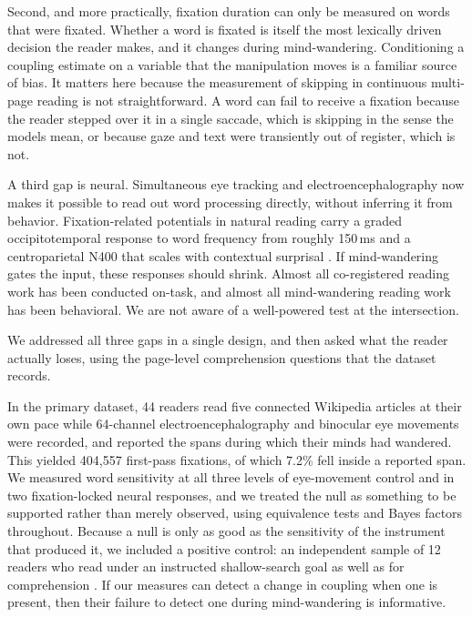\documentclass[11pt]{article}
\begin{document}
Second, and more practically, fixation duration can only be measured on words that were
fixated. Whether a word is fixated is itself the most lexically driven decision the reader
makes, and it changes during mind-wandering. Conditioning a coupling estimate on a variable
that the manipulation moves is a familiar source of bias. It matters here because the
measurement of skipping in continuous multi-page reading is not straightforward. A word can
fail to receive a fixation because the reader stepped over it in a single saccade, which is
skipping in the sense the models mean, or because gaze and text were transiently out of
register, which is not.

A third gap is neural. Simultaneous eye tracking and electroencephalography now makes it
possible to read out word processing directly, without inferring it from behavior. Fixation-related
potentials in natural reading carry a graded occipitotemporal response to word frequency
from roughly 150\,ms and a centroparietal N400 that scales with contextual surprisal
\citep{dimigen2011,kutas2011,frank2015}. If mind-wandering gates the input, these responses
should shrink. Almost all co-registered reading work has been conducted on-task, and almost
all mind-wandering reading work has been behavioral. We are not aware of a well-powered test
at the intersection.

We addressed all three gaps in a single design, and then asked what the reader actually loses,
using the page-level comprehension questions that the dataset records.

In the primary dataset, 44 readers read five
connected Wikipedia articles at their own pace while 64-channel electroencephalography and
binocular eye movements were recorded, and reported the spans during which their minds had
wandered. This yielded 404{,}557 first-pass fixations, of which 7.2\% fell inside a reported
span. We measured word sensitivity at all three levels of eye-movement control and in two
fixation-locked neural responses, and we treated the null as something to be supported rather
than merely observed, using equivalence tests and Bayes factors throughout. Because a null is
only as good as the sensitivity of the instrument that produced it, we included a positive
control: an independent sample of 12 readers who read under an instructed shallow-search goal
as well as for comprehension \citep{hollenstein2018}. If our measures can detect a change in
coupling when one is present, then their failure to detect one during mind-wandering is
informative.
\end{document}

